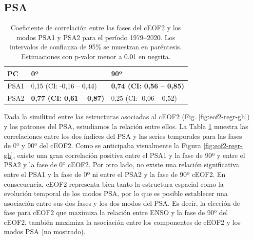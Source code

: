 \documentclass[12pt,oneside,a4paper]{reedthesis}
\begin{document}
\hypertarget{psa}{%
\subsection{PSA}\label{psa}}





\begin{table}

\caption{\label{tab:psa-eof2}Coeficiente de correlación entre las fases del cEOF2 y los modos PSA1 y PSA2 para el período 1979--2020.
Los intervalos de confianza de 95\% se muestran en paréntesis.
Estimaciones con p-valor menor a 0.01 en negrita.}
\centering
\begin{tabular}[t]{l>{}l>{}l}
\toprule
PC & 0º & 90º\\
\midrule
PSA1 & 0,15 (CI: -0,16 -- 0,44) & \textbf{0,74 (CI: 0,56 -- 0,85)}\\
\cmidrule{1-3}
PSA2 & \textbf{0,77 (CI: 0,61 -- 0,87)} & 0,25 (CI: -0,06 -- 0,52)\\
\bottomrule
\end{tabular}
\end{table}

Dada la similitud entre las estructuras asociadas al cEOF2 (Fig. \ref{fig:eof2-regr-gh}) y los patrones del PSA, estudiamos la relación entre ellos.
La Tabla \ref{tab:psa-eof2} muestra las correlaciones entre los dos índices del PSA y las series temporales para las fases de 0º y 90º del cEOF2.
Como se anticipaba visualmente la Figura \ref{fig:eof2-regr-gh}, existe una gran correlación positiva entre el PSA1 y la fase de 90º y entre el PSA2 y la fase de 0º cEOF2.
Por otro lado, no existe una relación significativa entre el PSA1 y la fase de 0º ni entre el PSA2 y la fase de 90º cEOF2.
En consecuencia, cEOF2 representa bien tanto la estructura espacial como la evolución temporal de los modos PSA, por lo que es posible establecer una asociación entre sus dos fases y los dos modos del PSA.
Es decir, la elección de fase para cEOF2 que maximiza la relación entre ENSO y la fase de 90º del cEOF2, también maximiza la asociación entre los componentes de cEOF2 y los modos PSA (no mostrado).
\end{document}
